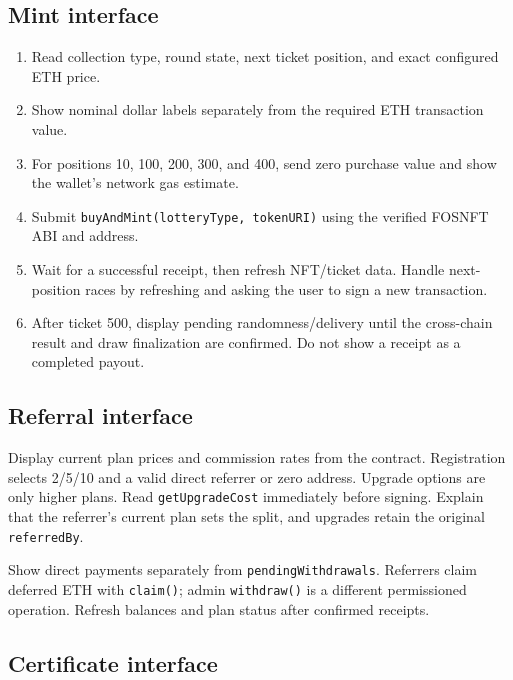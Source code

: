 \documentclass[
  10pt,
  letterpaper,
]{article}
\providecommand{\tightlist}{%
  \setlength{\itemsep}{0pt}\setlength{\parskip}{0pt}}
\begin{document}
\subsection{Mint interface}\label{mint-interface}

\begin{enumerate}
\def\labelenumi{\arabic{enumi}.}
\tightlist
\item
  Read collection type, round state, next ticket position, and exact
  configured ETH price.
\item
  Show nominal dollar labels separately from the required ETH
  transaction value.
\item
  For positions 10, 100, 200, 300, and 400, send zero purchase value and
  show the wallet's network gas estimate.
\item
  Submit \texttt{buyAndMint(lotteryType,\ tokenURI)} using the verified
  FOSNFT ABI and address.
\item
  Wait for a successful receipt, then refresh NFT/ticket data. Handle
  next-position races by refreshing and asking the user to sign a new
  transaction.
\item
  After ticket 500, display pending randomness/delivery until the
  cross-chain result and draw finalization are confirmed. Do not show a
  receipt as a completed payout.
\end{enumerate}

\subsection{Referral interface}\label{referral-interface}

Display current plan prices and commission rates from the contract.
Registration selects 2/5/10 and a valid direct referrer or zero address.
Upgrade options are only higher plans. Read \texttt{getUpgradeCost}
immediately before signing. Explain that the referrer's current plan
sets the split, and upgrades retain the original \texttt{referredBy}.

Show direct payments separately from \texttt{pendingWithdrawals}.
Referrers claim deferred ETH with \texttt{claim()}; admin
\texttt{withdraw()} is a different permissioned operation. Refresh
balances and plan status after confirmed receipts.

\subsection{Certificate interface}\label{certificate-interface}
\end{document}
